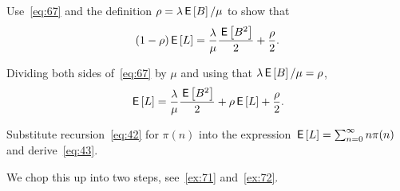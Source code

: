 \begin{extra}
 Use~\cref{eq:67} and the definition $\rho=\lambda \,\mathsf{E}\left[B\right]/\mu$ to show that
\begin{equation*}
(1- \rho) \,\mathsf{E}\left[L\right] = \frac{\lambda}\mu \frac{\,\mathsf{E}\left[B^2\right]}2 + \frac\rho2.
\end{equation*}
\begin{solution}
 Dividing both sides of~\cref{eq:67} by $\mu$ and using that $\lambda \,\mathsf{E}\left[B\right]/\mu = \rho$,
\begin{equation*}
 \,\mathsf{E}\left[L\right] = \frac{\lambda}{\mu} \frac{\,\mathsf{E}\left[B^2\right]}2 + \rho \,\mathsf{E}\left[L\right] + \frac\rho2.
\end{equation*}
\end{solution}
\end{extra}

\begin{exercise}
 Substitute recursion~\cref{eq:42} for $\pi(n)$ into the expression $\,\mathsf{E}\left[L\right] = \sum_{n=0}^\infty n \pi(n)$ and derive~\cref{eq:43}.
\begin{solution}
 We chop this up into two steps, see~\cref{ex:71} and~\cref{ex:72}.
\end{solution}
\end{exercise}


